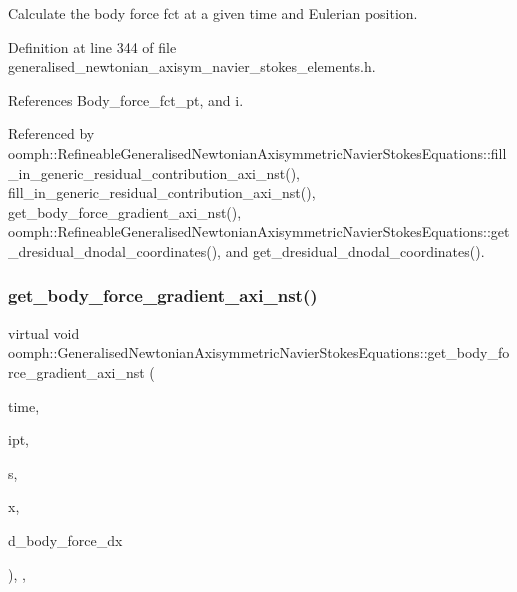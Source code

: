 Calculate the body force fct at a given time and Eulerian position. 



Definition at line 344 of file generalised\+\_\+newtonian\+\_\+axisym\+\_\+navier\+\_\+stokes\+\_\+elements.\+h.



References Body\+\_\+force\+\_\+fct\+\_\+pt, and i.



Referenced by oomph\+::\+Refineable\+Generalised\+Newtonian\+Axisymmetric\+Navier\+Stokes\+Equations\+::fill\+\_\+in\+\_\+generic\+\_\+residual\+\_\+contribution\+\_\+axi\+\_\+nst(), fill\+\_\+in\+\_\+generic\+\_\+residual\+\_\+contribution\+\_\+axi\+\_\+nst(), get\+\_\+body\+\_\+force\+\_\+gradient\+\_\+axi\+\_\+nst(), oomph\+::\+Refineable\+Generalised\+Newtonian\+Axisymmetric\+Navier\+Stokes\+Equations\+::get\+\_\+dresidual\+\_\+dnodal\+\_\+coordinates(), and get\+\_\+dresidual\+\_\+dnodal\+\_\+coordinates().

\mbox{\label{classoomph_1_1GeneralisedNewtonianAxisymmetricNavierStokesEquations_afa05d1b987360f333b38aea67991f732}} 
\subsubsection{\texorpdfstring{get\+\_\+body\+\_\+force\+\_\+gradient\+\_\+axi\+\_\+nst()}{get\_body\_force\_gradient\_axi\_nst()}}
{\footnotesize\ttfamily virtual void oomph\+::\+Generalised\+Newtonian\+Axisymmetric\+Navier\+Stokes\+Equations\+::get\+\_\+body\+\_\+force\+\_\+gradient\+\_\+axi\+\_\+nst (\begin{DoxyParamCaption}\item[{const double \&}]{time,  }\item[{const unsigned \&}]{ipt,  }\item[{const \hyperlink{classoomph_1_1Vector}{Vector}$<$ double $>$ \&}]{s,  }\item[{const \hyperlink{classoomph_1_1Vector}{Vector}$<$ double $>$ \&}]{x,  }\item[{\hyperlink{classoomph_1_1DenseMatrix}{Dense\+Matrix}$<$ double $>$ \&}]{d\+\_\+body\+\_\+force\+\_\+dx }\end{DoxyParamCaption})\hspace{0.3cm}{\ttfamily [inline]}, {\ttfamily [protected]}, {\ttfamily [virtual]}}



